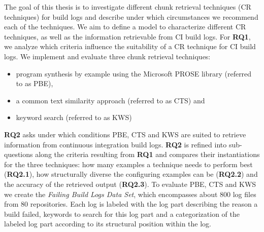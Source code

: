 \documentclass[\myrootdir/main.tex]{subfiles}
\begin{document}
The goal of this thesis is to investigate different chunk retrieval techniques (CR techniques) for build logs and describe under which circumstances we recommend each of the techniques.
We aim to define a model to characterize different CR techniques, as well as the information retrievable from CI build logs.
For \textbf{RQ1}, we analyze which criteria influence the suitability of a CR technique for CI build logs.
We implement and evaluate three chunk retrieval techniques:
\begin{itemize}
  \item program synthesis by example using the Microsoft PROSE library (referred to as PBE),
  \item a common text similarity approach (referred to as CTS) and
  \item keyword search (referred to as KWS)
\end{itemize}
\textbf{RQ2} asks under which conditions PBE, CTS and KWS are suited to retrieve information from continuous integration build logs.
\textbf{RQ2} is refined into sub-questions along the criteria resulting from \textbf{RQ1} and compares their instantiations for the three techniques:
how many examples a technique needs to perform best (\textbf{RQ2.1}), how structurally diverse the configuring examples can be (\textbf{RQ2.2}) and the accuracy of the retrieved output (\textbf{RQ2.3}).
To evaluate PBE, CTS and KWS we create the \emph{Failing Build Logs Data Set}, which encompasses about 800 log files from 80 repositories.
Each log is labeled with the log part describing the reason a build failed, keywords to search for this log part and a categorization of the labeled log part according to its structural position within the log.
\end{document}
